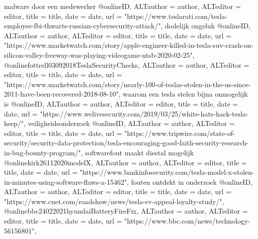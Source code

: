 {{{malware door een medewerker
@online{ID,	ALTauthor = {author},	ALTeditor = {editor},	title = {title},	date = {date},	url = {"https://www.teslarati.com/tesla-employee-fbi-thwarts-russian-cybersecurity-attack/"},}
dodelijk ongeluk
@online{ID,	ALTauthor = {author},	ALTeditor = {editor},	title = {title},	date = {date},	url = {"https://www.marketwatch.com/story/apple-engineer-killed-in-tesla-suv-crash-on-silicon-valley-freeway-was-playing-videogame-ntsb-2020-02-25"},}
@online{fottrell03092018TeslaSecurityChecks,	ALTauthor = {author},	ALTeditor = {editor},	title = {title},	date = {date},	url = {"https://www.marketwatch.com/story/nearly-100-of-teslas-stolen-in-the-us-since-2011-have-been-recovered-2018-08-10"},}
waarom een tesla stelen bijna onmogelijk is
@online{ID,	ALTauthor = {author},	ALTeditor = {editor},	title = {title},	date = {date},	url = {"https://www.welivesecurity.com/2019/03/25/white-hats-hack-tesla-keep/"},}
veiligheidsonderzoek
@online{ID,	ALTauthor = {author},	ALTeditor = {editor},	title = {title},	date = {date},	url = {"https://www.tripwire.com/state-of-security/security-data-protection/tesla-encouraging-good-faith-security-research-in-bug-bounty-program/"},}
softwarefout maakt diestal mogelijk
@online{kirk26112020modelX,	ALTauthor = {author},	ALTeditor = {editor},	title = {title},	date = {date},	url = {"https://www.bankinfosecurity.com/tesla-model-x-stolen-in-minutes-using-software-flaws-a-15462"},}
fouten ontdekt in onderzoek
@online{ID,	ALTauthor = {author},	ALTeditor = {editor},	title = {title},	date = {date},	url = {"https://www.cnet.com/roadshow/news/tesla-ev-appeal-loyalty-study/"},}
@online{bbc24022021hyundaiBatteryFireFix,	ALTauthor = {author},	ALTeditor = {editor},	title = {title},	date = {date},	url = {"https://www.bbc.com/news/technology-56156801"},}








}}}
